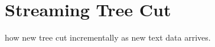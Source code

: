 %




\section{Streaming Tree Cut}\label{sec:tree-cut}
 how  new tree cut  incrementally  as new text data arrives.

